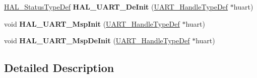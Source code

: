 \begin{DoxyCompactItemize}
\item 
\hyperlink{stm32f4xx__hal__def_8h_a63c0679d1cb8b8c684fbb0632743478f}{H\+A\+L\+\_\+\+Status\+Type\+Def} {\bfseries H\+A\+L\+\_\+\+U\+A\+R\+T\+\_\+\+De\+Init} (\hyperlink{struct_u_a_r_t___handle_type_def}{U\+A\+R\+T\+\_\+\+Handle\+Type\+Def} $\ast$huart)\hypertarget{group___u_a_r_t___exported___functions___group1_ga8d98eaab25e61ae12e2e240c3388c57b}{}\label{group___u_a_r_t___exported___functions___group1_ga8d98eaab25e61ae12e2e240c3388c57b}

\item 
void {\bfseries H\+A\+L\+\_\+\+U\+A\+R\+T\+\_\+\+Msp\+Init} (\hyperlink{struct_u_a_r_t___handle_type_def}{U\+A\+R\+T\+\_\+\+Handle\+Type\+Def} $\ast$huart)\hypertarget{group___u_a_r_t___exported___functions___group1_ga0e553b32211877322f949b14801bbfa7}{}\label{group___u_a_r_t___exported___functions___group1_ga0e553b32211877322f949b14801bbfa7}

\item 
void {\bfseries H\+A\+L\+\_\+\+U\+A\+R\+T\+\_\+\+Msp\+De\+Init} (\hyperlink{struct_u_a_r_t___handle_type_def}{U\+A\+R\+T\+\_\+\+Handle\+Type\+Def} $\ast$huart)\hypertarget{group___u_a_r_t___exported___functions___group1_ga718f39804e3b910d738a0e1e46151188}{}\label{group___u_a_r_t___exported___functions___group1_ga718f39804e3b910d738a0e1e46151188}

\end{DoxyCompactItemize}


\subsection{Detailed Description}
